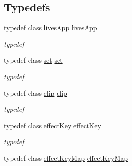 \subsection*{Typedefs}
\begin{DoxyCompactItemize}
\item 
\hypertarget{namespacelives_a86fb37876fc3d921867e0b8dbeba6a00}{typedef class \hyperlink{classlives_1_1livesApp}{lives\-App} \hyperlink{namespacelives_a86fb37876fc3d921867e0b8dbeba6a00}{lives\-App}}\label{namespacelives_a86fb37876fc3d921867e0b8dbeba6a00}

\begin{DoxyCompactList}\small\item\em typedef \end{DoxyCompactList}\item 
\hypertarget{namespacelives_a3e8aa16c8d4cc3d4ee5c7b110813c27b}{typedef class \hyperlink{classlives_1_1set}{set} \hyperlink{namespacelives_a3e8aa16c8d4cc3d4ee5c7b110813c27b}{set}}\label{namespacelives_a3e8aa16c8d4cc3d4ee5c7b110813c27b}

\begin{DoxyCompactList}\small\item\em typedef \end{DoxyCompactList}\item 
\hypertarget{namespacelives_a489f7c440b1190bc88d89e49971fd233}{typedef class \hyperlink{classlives_1_1clip}{clip} \hyperlink{namespacelives_a489f7c440b1190bc88d89e49971fd233}{clip}}\label{namespacelives_a489f7c440b1190bc88d89e49971fd233}

\begin{DoxyCompactList}\small\item\em typedef \end{DoxyCompactList}\item 
\hypertarget{namespacelives_aa04fd38ebd75be1b874165b00e2787e1}{typedef class \hyperlink{classlives_1_1effectKey}{effect\-Key} \hyperlink{namespacelives_aa04fd38ebd75be1b874165b00e2787e1}{effect\-Key}}\label{namespacelives_aa04fd38ebd75be1b874165b00e2787e1}

\begin{DoxyCompactList}\small\item\em typedef \end{DoxyCompactList}\item 
\hypertarget{namespacelives_a24744112f352a8bd69cf3360ee7fca4e}{typedef class \hyperlink{classlives_1_1effectKeyMap}{effect\-Key\-Map} \hyperlink{namespacelives_a24744112f352a8bd69cf3360ee7fca4e}{effect\-Key\-Map}}\label{namespacelives_a24744112f352a8bd69cf3360ee7fca4e}


\end{DoxyCompactItemize}
